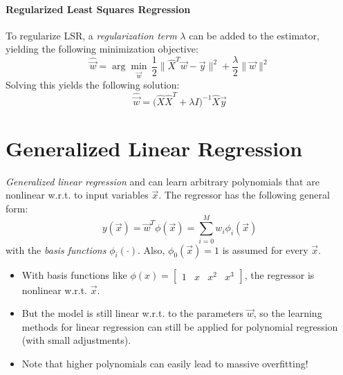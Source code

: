 			\paragraph{Regularized Least Squares Regression}
				To regularize LSR, a \emph{regularization term} \(\lambda\) can be added to the estimator, yielding the following minimization objective:
				\begin{equation}
					\hat{\vec{w}} = \arg\min\limits_{\vec{w}} \, \frac{1}{2} \big\lVert \hat{X}^T \vec{w} - \vec{y} \big\rVert^2 + \frac{\lambda}{2} \lVert \vec{w} \rVert^2
				\end{equation}
				Solving this yields the following solution:
				\begin{equation}
					\hat{\vec{w}} = \Big( \hat{X} \hat{X}^T + \lambda I \Big)^{-1} \hat{X} \vec{y}
				\end{equation}


	\section{Generalized Linear Regression}
		\emph{Generalized linear regression} and can learn arbitrary polynomials that are nonlinear w.r.t. to input variables \(\vec{x}\). The regressor has the following general form:
		\begin{equation}
			y(\vec{x}) = \vec{w}^T \phi(\vec{x}) = \sum_{i = 0}^{M} w_i \phi_i(\vec{x})
		\end{equation}
		with the \emph{basis functions} \( \phi_i(\cdot) \). Also, \( \phi_0(\vec{x}) = 1 \) is assumed for every \(\vec{x}\).

		\begin{itemize}
			\item With basis functions like \( \phi(x) = \begin{bmatrix} 1 & x & x^2 & x^3 \end{bmatrix} \), the regressor is nonlinear w.r.t. \(\vec{x}\).
			\item But the model is still linear w.r.t. to the parameters \(\vec{w}\), so the learning methods for linear regression can still be applied for polynomial regression (with small adjustments).
			\item Note that higher polynomials can easily lead to massive overfitting!
		\end{itemize}
	
